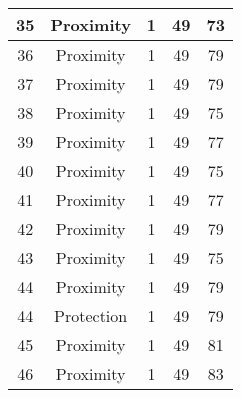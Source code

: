 \documentclass[results.tex]{subfiles}
\begin{document}
\begin{center}
\begin{tabular}{| c || c | c | c | c |}
            \hline
            35                      & Proximity                    & 1                      & 49                      & 73                   \\
            \hline
            36                      & Proximity                    & 1                      & 49                      & 79                   \\
            \hline
            37                      & Proximity                    & 1                      & 49                      & 79                   \\
            \hline
            38                      & Proximity                    & 1                      & 49                      & 75                   \\
            \hline
            39                      & Proximity                    & 1                      & 49                      & 77                   \\
            \hline
            40                      & Proximity                    & 1                      & 49                      & 75                   \\
            \hline
            41                      & Proximity                    & 1                      & 49                      & 77                   \\
            \hline
            42                      & Proximity                    & 1                      & 49                      & 79                   \\
            \hline
            43                      & Proximity                    & 1                      & 49                      & 75                   \\
            \hline
            44                      & Proximity                    & 1                      & 49                      & 79                   \\
            \hline
            44                      & Protection                   & 1                      & 49                      & 79                   \\
            \hline
            45                      & Proximity                    & 1                      & 49                      & 81                   \\
            \hline
            46                      & Proximity                    & 1                      & 49                      & 83                   \\

\end{tabular}
\end{center}
\end{document}
